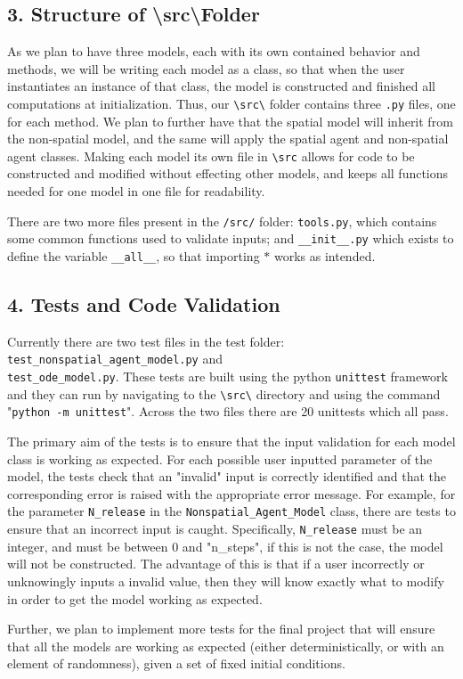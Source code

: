 \documentclass{article}
\begin{document}
\subsection*{3. Structure of \textbackslash src\textbackslash\;Folder}
As we plan to have three models, each with its own contained behavior and methods, we will be writing each model as a class, so that when the user instantiates an instance of that class, the model is constructed and finished all computations at initialization. Thus, our \verb|\src\| folder contains three \verb|.py| files, one for each method. We plan to further have that the spatial model will inherit from the non-spatial model, and the same will apply the spatial agent and non-spatial agent classes. Making each model its own file in \verb|\src| allows for code to be constructed and modified without effecting other models, and keeps all functions needed for one model in one file for readability.\par
There are two more files present in the \verb|/src/| folder: \verb|tools.py|, which contains some common functions used to validate inputs; and \verb|__init__.py| which exists to define the variable \verb|__all__|, so that importing $\ast$ works as intended.

\subsection*{4. Tests and Code Validation}
Currently there are two test files in the test folder: \verb|test_nonspatial_agent_model.py| and \\
\verb|test_ode_model.py|. These tests are built using the python \verb|unittest| framework and they can run by navigating to the \verb|\src\| directory and using the command "\verb|python -m unittest|". Across the two files there are 20 unittests which all pass. \par
The primary aim of the tests is to ensure that the input validation for each model class is working as expected. For each possible user inputted parameter of the model, the tests check that an "invalid" input is correctly identified and that the corresponding error is raised with the appropriate error message. 
For example, for the parameter \verb|N_release| in the \verb|Nonspatial_Agent_Model| class, there are tests to ensure that an incorrect input is caught. Specifically, \verb|N_release| must be an integer, and must be between 0 and "n\_steps", if this is not the case, the model will not be constructed.
The advantage of this is that if a user incorrectly or unknowingly inputs a invalid value, then they will know exactly what to modify in order to get the model working as expected. \par
Further, we plan to implement more tests for the final project that will ensure that all the models are working as expected (either deterministically, or with an element of randomness), given a set of fixed initial conditions.
\end{document}

